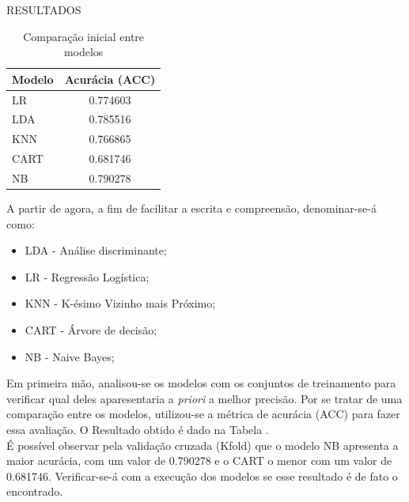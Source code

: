 
\noindent \textcolor{COLOR2}{RESULTADOS}
\\

\begin{table}[ht]
    \label{tab:resultados}
    \centering
    \begin{tabular}{lc}
        \rowcolor{pagecolor!50!COLOR1}
        \hline
        Modelo & Acurácia (ACC) \\\hline\hline
        LR     & 0.774603       \\\hline
        LDA    & 0.785516       \\\hline
        KNN    & 0.766865       \\\hline
        CART   & 0.681746       \\\hline
        NB     & 0.790278
    \end{tabular}
    \caption{Comparação inicial entre modelos}
\end{table}

A partir de agora, a fim de facilitar a escrita e compreensão, denominar-se-á como:

\begin{itemize}
    \item \textcolor{deepblue}{LDA} - Análise discriminante;
    \item \textcolor{deepblue}{LR} - Regressão Logística;
    \item \textcolor{deepblue}{KNN} - K-ésimo Vizinho mais Próximo;
    \item \textcolor{deepblue}{CART} - Árvore de decisão;
    \item \textcolor{deepblue}{NB} - Naive Bayes;
\end{itemize}

Em primeira mão, analisou-se os modelos com os conjuntos de treinamento para verificar qual deles aparesentaria a \textit{priori} a melhor precisão. Por se tratar de uma comparação entre os modelos, utilizou-se a métrica de acurácia (ACC) para fazer essa avaliação. O Resultado obtido é dado na Tabela \pageref{tab:resultados}.\\

É possível observar pela validação cruzada (Kfold) que o modelo NB apresenta a maior acurácia, com um valor de 0.790278 e o CART o menor com um valor de 0.681746. Verificar-se-á com a execução dos modelos se esse resultado é de fato o encontrado.
\\

